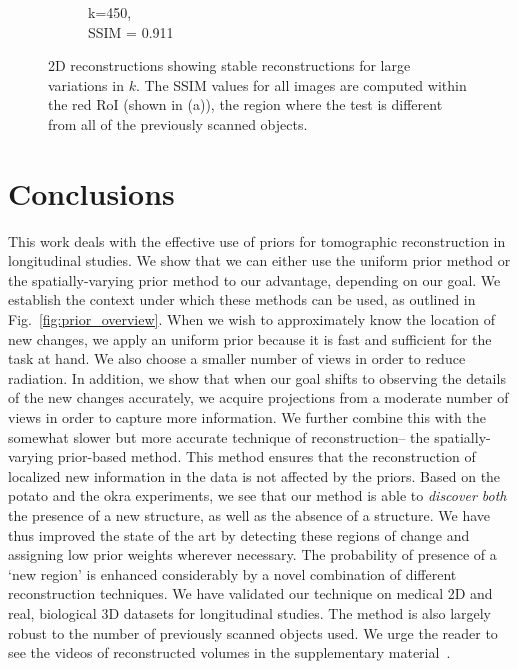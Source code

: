 \documentclass[journal]{IEEEtran}
\begin{document}
\begin{figure}[h]
\begin{subfigure}[b]{0.24\linewidth}
        \caption{k=450,\\ SSIM = 0.911}
     \end{subfigure}
    \caption{2D reconstructions showing stable reconstructions for large variations in $k$. The SSIM values for all images are computed within the red RoI (shown in (a)), the region where the test is different from all of the previously scanned objects.}
\label{fig:reconstructions_as_k_varies}
\end{figure}


\section{Conclusions}
\label{sec:conclusions}
This work deals with the effective use of priors for tomographic
reconstruction in longitudinal studies. We show that we can either use
the uniform prior method or the spatially-varying prior method to our
advantage, depending on our goal. We establish the context under which
these methods can be used, as outlined in
Fig.~\ref{fig:prior_overview}. When we wish to approximately know the
location of new changes, we apply an uniform prior because it is fast
and sufficient for the task at hand. We also choose a smaller number
of views in order to reduce radiation. In addition, we show that when
our goal shifts to observing the details of the new changes
accurately, we acquire projections from a moderate number of views in
order to capture more information. We further combine this with the
somewhat slower but more accurate technique of reconstruction-- the
spatially-varying prior-based method. This method ensures that the
reconstruction of localized new information in the data is not
affected by the priors. Based on the potato and the okra experiments,
we see that our method is able to \emph{discover both} the presence of
a new structure, as well as the absence of a structure. We have thus
improved the state of the art by detecting these regions of change and
assigning low prior weights wherever necessary. The probability of
presence of a `new region' is enhanced considerably by a novel
combination of different reconstruction techniques.  We have validated
our technique on medical 2D and real, biological 3D datasets for
longitudinal studies. The method is also largely robust to the number
of previously scanned objects used. We urge the reader to see the
videos of reconstructed volumes in the supplementary
material~\cite{supp_paper}.
\end{document}

